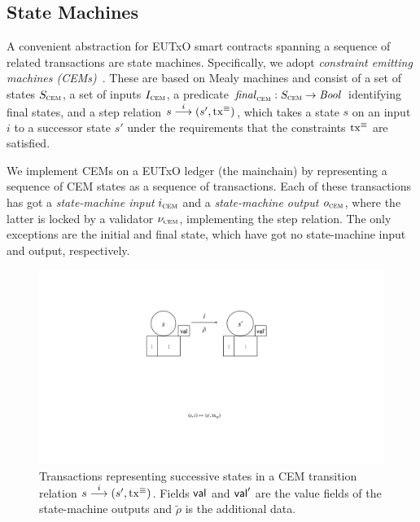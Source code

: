 
\subsection{State Machines}
A convenient abstraction for EUTxO smart contracts spanning a sequence
of related transactions are state machines. Specifically, we adopt
\emph{constraint emitting machines (CEMs)}~\cite{eutxo}. These are
based on Mealy machines and consist of a set of states $S_{\textsc{cem}}$, a set
of inputs $I_{\textsc{cem}}$, a predicate \(\mathit{final}_{\textsc{cem}} : S_{\textsc{cem}}\to\mathit{Bool}\)
identifying final states, and a step relation
\({s}\overset{i}\longrightarrow(s', \mathrm{tx}^\equiv)\), which takes a state $s$ on an
input $i$ to a successor state $s'$ under the requirements that the
constraints $\mathrm{tx}^\equiv$ are satisfied.

We implement CEMs on a EUTxO ledger (the mainchain) by representing a sequence of CEM states as a sequence of transactions. Each of these transactions has got a \emph{state-machine input} $i_{\textsc{cem}}$ and a \emph{state-machine output} $o_{\textsc{cem}}$, where the latter is locked by a validator $\nu_{\textsc{cem}}$, implementing the step relation. The only exceptions are the initial and final state, which have got no state-machine input and output, respectively.

\begin{figure}[t]
  \centering
  \includegraphics[scale=.2,width=\textwidth/2]{figures/state-transition_cropped.pdf}
  \caption{Transactions representing successive states in a CEM
    transition relation \({s}\overset{i}\longrightarrow(s', \mathrm{tx}^\equiv)\).  Fields
    $\mathsf{val}$ and $\mathsf{val}'$ are the value fields of the state-machine
    outputs and $\tilde \rho$ is the additional data.}
  \label{fig:state-transition}
\end{figure}

